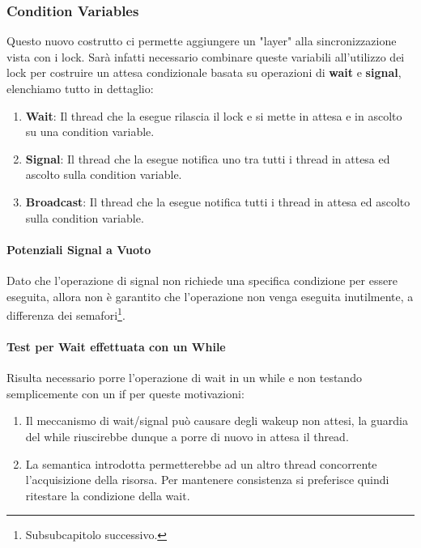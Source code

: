 \documentclass{article}
\begin{document}
\newpage

\subsubsection{Condition Variables}

Questo nuovo costrutto ci permette aggiungere un "layer" alla sincronizzazione vista con i lock. Sarà infatti necessario combinare queste variabili
all'utilizzo dei lock per costruire un attesa condizionale basata su operazioni di \textbf{wait} e \textbf{signal}, elenchiamo tutto in dettaglio:

\begin{enumerate}
    \item \textbf{Wait}: Il thread che la esegue rilascia il lock e si mette in attesa e in ascolto su una condition variable.
    \item \textbf{Signal}: Il thread che la esegue notifica uno tra tutti i thread in attesa ed ascolto sulla condition variable.
    \item \textbf{Broadcast}: Il thread che la esegue notifica tutti i thread in attesa ed ascolto sulla condition variable.
\end{enumerate}

\paragraph{Potenziali Signal a Vuoto} Dato che l'operazione di signal non richiede una specifica condizione per essere eseguita, allora non è garantito
che l'operazione non venga eseguita inutilmente, a differenza dei semafori\footnote{Subsubcapitolo successivo.}.

\paragraph{Test per Wait effettuata con un While} Risulta necessario porre l'operazione di wait in un while e non testando semplicemente con un if per
queste motivazioni:

\begin{enumerate}
    \item Il meccanismo di wait/signal può causare degli wakeup non attesi, la guardia del while riuscirebbe dunque a porre di nuovo in attesa il thread.
    \item La semantica introdotta permetterebbe ad un altro thread concorrente l'acquisizione della risorsa. Per mantenere consistenza si preferisce quindi
    ritestare la condizione della wait.
\end{enumerate}
\end{document}
